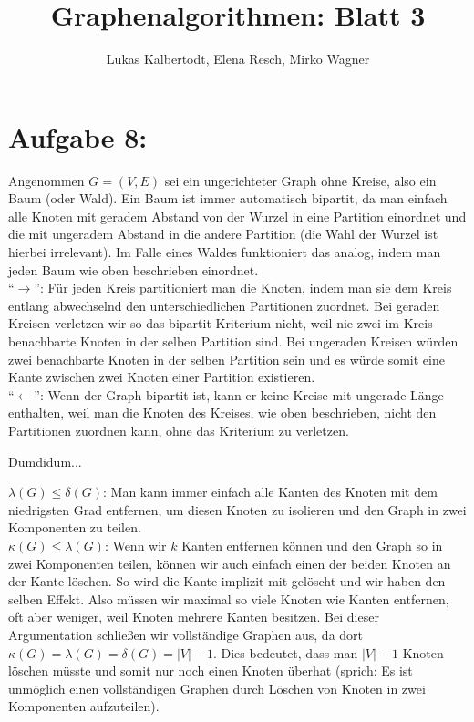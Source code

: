 \documentclass[11pt]{scrartcl} %
\title{Graphenalgorithmen: Blatt 3}
\author{Lukas Kalbertodt, Elena Resch, Mirko Wagner}
\begin{document}
\maketitle
\section*{Aufgabe 8:}
\begin{compactenum}[(a)]
\item Angenommen $G = (V, E)$ sei ein ungerichteter Graph ohne Kreise, also ein Baum (oder Wald). Ein Baum ist immer automatisch bipartit, da man einfach alle Knoten mit geradem Abstand von der Wurzel in eine Partition einordnet und die mit ungeradem Abstand in die andere Partition (die Wahl der Wurzel ist hierbei irrelevant). Im Falle eines Waldes funktioniert das analog, indem man jeden Baum wie oben beschrieben einordnet.\\
\enquote{$\rightarrow$}: Für jeden Kreis partitioniert man die Knoten, indem man sie dem Kreis entlang abwechselnd den unterschiedlichen Partitionen zuordnet. Bei geraden Kreisen verletzen wir so das bipartit-Kriterium nicht, weil nie zwei im Kreis benachbarte Knoten in der selben Partition sind. Bei ungeraden Kreisen würden zwei benachbarte Knoten in der selben Partition sein und es würde somit eine Kante zwischen zwei Knoten einer Partition existieren.\\
\enquote{$\leftarrow$}: Wenn der Graph bipartit ist, kann er keine Kreise mit ungerade Länge enthalten, weil man die Knoten des Kreises, wie oben beschrieben, nicht den Partitionen zuordnen kann, ohne das Kriterium zu verletzen.\\
\item Dumdidum...\\
\item $\lambda(G) \le \delta(G)$: Man kann immer einfach alle Kanten des Knoten mit dem niedrigsten Grad entfernen, um diesen Knoten zu isolieren und den Graph in zwei Komponenten zu teilen.\\
$\kappa(G) \le \lambda(G)$: Wenn wir $k$ Kanten entfernen können und den Graph so in zwei Komponenten teilen, können wir auch einfach einen der beiden Knoten an der Kante löschen. So wird die Kante implizit mit gelöscht und wir haben den selben Effekt. Also müssen wir maximal so viele Knoten wie Kanten entfernen, oft aber weniger, weil Knoten mehrere Kanten besitzen. Bei dieser Argumentation schließen wir vollständige Graphen aus, da dort $\kappa(G)=\lambda(G)=\delta(G)=|V|-1$. Dies bedeutet, dass man $|V|-1$ Knoten löschen müsste und somit nur noch einen Knoten überhat (sprich: Es ist unmöglich einen vollständigen Graphen durch Löschen von Knoten in zwei Komponenten aufzuteilen).

\end{compactenum}
\end{document}
